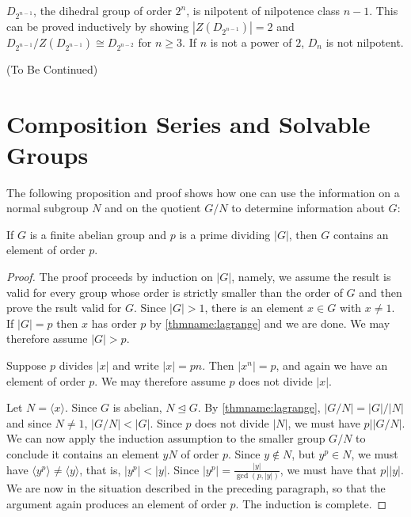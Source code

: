 \documentclass[12pt, a4paper, oneside, openright, titlepage]{book}
\begin{document}
\begin{eg}
    $D_{2^{n-1}}$, the dihedral group of order $2^n$, is nilpotent of nilpotence class $n-1$. This can be proved inductively by showing $|Z(D_{2^{n-1}})| = 2$ and $D_{2^{n-1}}/Z(D_{2^{n-1}}) \cong D_{2^{n-2}}$ for $n \geq 3$. If $n$ is not a power of $2$, $D_n$ is not nilpotent.
\end{eg}


(To Be Continued)


\section{\textsection Composition Series and Solvable Groups}

The following proposition and proof shows how one can use the information on a normal subgroup $N$ and on the quotient $G/N$ to determine information about $G$:

\begin{prop}
    If $G$ is a finite abelian group and $p$ is a prime dividing $|G|$, then $G$ contains an element of order $p$.
\end{prop}
\begin{proof}
    The proof proceeds by induction on $|G|$, namely, we assume the result is valid for every group whose order is strictly smaller than the order of $G$ and then prove the rsult valid for $G$. Since $|G| > 1$, there is an element $x \in G$ with $x \neq 1$. If $|G| = p$ then $x$ has order $p$ by \ref{thmname:lagrange} and we are done. We may therefore assume $|G| > p$.

    Suppose $p$ divides $|x|$ and write $|x| = pn$. Then $|x^n| = p$, and again we have an element of order $p$. We may therefore assume $p$ does not divide $|x|$.

    Let $N = \langle x\rangle$. Since $G$ is abelian, $N \trianglelefteq G$. By \ref{thmname:lagrange}, $|G/N| = |G|/|N|$ and since $N \neq 1$, $|G/N| < |G|$. Since $p$ does not divide $|N|$, we must have $p\vert |G/N|$. We can now apply the induction assumption to the smaller group $G/N$ to conclude it contains an element $yN$ of order $p$. Since $y \notin N$, but $y^p \in N$, we must have $\langle y^p\rangle \neq \langle y\rangle$, that is, $|y^p| < |y|$. Since $|y^p| = \frac{|y|}{\gcd(p,|y|)}$, we must have that $p\vert |y|$. We are now in the situation described in the preceding paragraph, so that the argument again produces an element of order $p$. The induction is complete.
\end{proof}
\end{document}
